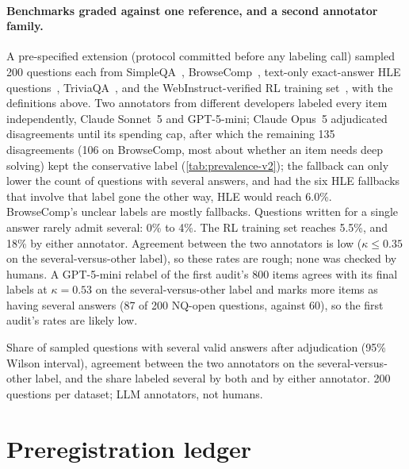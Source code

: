 \paragraph{Benchmarks graded against one reference, and a second annotator family.} A pre-specified extension (protocol committed before any labeling call) sampled 200 questions each from SimpleQA~\citep{wei2024simpleqa}, BrowseComp~\citep{wei2025browsecomp}, text-only exact-answer HLE questions~\citep{phan2025hle}, TriviaQA~\citep{joshi2017triviaqa}, and the WebInstruct-verified RL training set~\citep{ma2025generalreasoner}, with the definitions above. Two annotators from different developers labeled every item independently, Claude Sonnet~5 and GPT-5-mini; Claude Opus~5 adjudicated disagreements until its spending cap, after which the remaining 135 disagreements (106 on BrowseComp, most about whether an item needs deep solving) kept the conservative label (\cref{tab:prevalence-v2}); the fallback can only lower the count of questions with several answers, and had the six HLE fallbacks that involve that label gone the other way, HLE would reach 6.0\%. BrowseComp's unclear labels are mostly fallbacks. Questions written for a single answer rarely admit several: 0\% to 4\%. The RL training set reaches 5.5\%, and 18\% by either annotator. Agreement between the two annotators is low ($\kappa \le 0.35$ on the several-versus-other label), so these rates are rough; none was checked by humans. A GPT-5-mini relabel of the first audit's 800 items agrees with its final labels at $\kappa = 0.53$ on the several-versus-other label and marks more items as having several answers (87 of 200 NQ-open questions, against 60), so the first audit's rates are likely low.

\begin{table}[htbp]
\centering
\caption{Share of sampled questions with several valid answers after adjudication (95\% Wilson interval), agreement between the two annotators on the several-versus-other label, and the share labeled several by both and by either annotator. 200 questions per dataset; LLM annotators, not humans.\pre}
\label{tab:prevalence-v2}
\footnotesize
\begin{adjustbox}{max width=\linewidth}\end{adjustbox}
\end{table}

\FloatBarrier
\section{Preregistration ledger}
\label{app:ledger}

